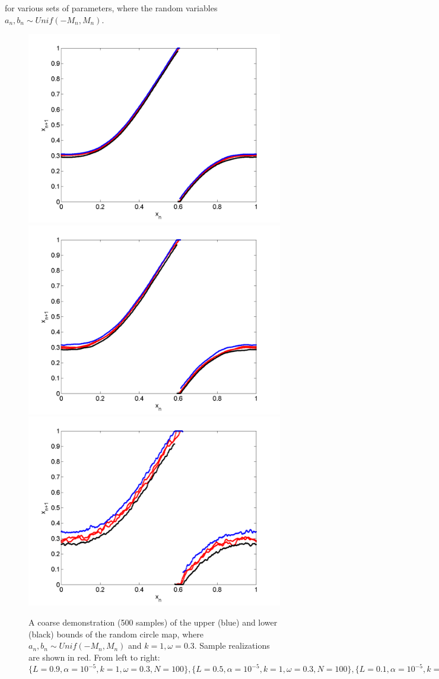 for various sets of parameters, where the random variables
$a_n,b_n\sim Unif(-M_n,M_n)$. 
\begin{figure}[htp]
\caption[Upper and lower bounds on the random circle map, with a uniform
distribution, where $k=1,\omega=0.3$]{A coarse
  demonstration (500 samples) of the upper (blue) and lower (black)
  bounds of the random circle map, where $a_n,b_n\sim Unif(-M_n,M_n)$
  and $k=1,\omega=0.3$. Sample realizations are shown in red. From left to right:
  $\{L=0.9,\alpha = 10^{-5},k=1,\omega=0.3,N=100\}, \{L=0.5,\alpha = 10^{-5},k=1,\omega=0.3,N=100\},\{L=0.1,\alpha = 10^{-5},k=1,\omega=0.3,N=100\},$
  }\label{fig:circ_u_envelope1}
\centering
\includegraphics[width=.3\textwidth]{figs/envelope_unif_500_k1_L09_w03.png}\hfill
\includegraphics[width=.3\textwidth]{figs/envelope_unif_500_k1_L05_w03.png}\hfill
\includegraphics[width=.3\textwidth]{figs/envelope_unif_500_k1_L01_w03.png}
\end{figure}


